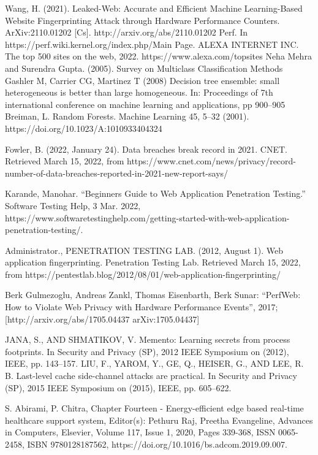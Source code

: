 \documentclass[conference]{IEEEtran}
\begin{document}
\begin{thebibliography}{00}
 Wang, H. (2021). Leaked-Web: Accurate and Efficient Machine Learning-Based Website Fingerprinting Attack through Hardware Performance Counters. ArXiv:2110.01202 [Cs]. http://arxiv.org/abs/2110.01202
 Perf. In https://perf.wiki.kernel.org/index.php/Main Page.
 ALEXA INTERNET INC. The top 500 sites on the web, 2022. https://www.alexa.com/topsites 
 Neha Mehra and Surendra Gupta. (2005). Survey on Multiclass Classification Methods
 Gashler M, Carrier CG, Martinez T (2008) Decision tree ensemble: small heterogeneous is better than large homogeneous. In: Proceedings of 7th international conference on machine learning and applications, pp 900–905
 Breiman, L. Random Forests. Machine Learning 45, 5–32 (2001). https://doi.org/10.1023/A:1010933404324

Fowler, B. (2022, January 24). Data breaches break record in 2021. CNET. Retrieved March 15, 2022, from https://www.cnet.com/news/privacy/record-number-of-data-breaches-reported-in-2021-new-report-says/ 

Karande, Manohar. “Beginners Guide to Web Application Penetration Testing.” Software Testing Help, 3 Mar. 2022, https://www.softwaretestinghelp.com/getting-started-with-web-application-penetration-testing/. 

Administrator., PENETRATION TESTING LAB. (2012, August 1). Web application fingerprinting. Penetration Testing Lab. Retrieved March 15, 2022, from https://pentestlab.blog/2012/08/01/web-application-fingerprinting/ 

Berk Gulmezoglu, Andreas Zankl, Thomas Eisenbarth, Berk Sunar: “PerfWeb: How to Violate Web Privacy with Hardware Performance Events”, 2017; [http://arxiv.org/abs/1705.04437 arXiv:1705.04437]

JANA, S., AND SHMATIKOV, V. Memento: Learning secrets from process footprints. In Security and Privacy (SP), 2012 IEEE Symposium on (2012), IEEE, pp. 143–157.
 LIU, F., YAROM, Y., GE, Q., HEISER, G., AND LEE, R. B. Last-level cache side-channel attacks are practical. In Security and Privacy (SP), 2015 IEEE Symposium on (2015), IEEE, pp. 605–622.

S. Abirami, P. Chitra, Chapter Fourteen - Energy-efficient edge based real-time healthcare support system, Editor(s): Pethuru Raj, Preetha Evangeline, Advances in Computers, Elsevier, Volume 117, Issue 1, 2020, Pages 339-368, ISSN 0065-2458, ISBN 9780128187562, https://doi.org/10.1016/bs.adcom.2019.09.007.


\end{thebibliography}
\end{document}
